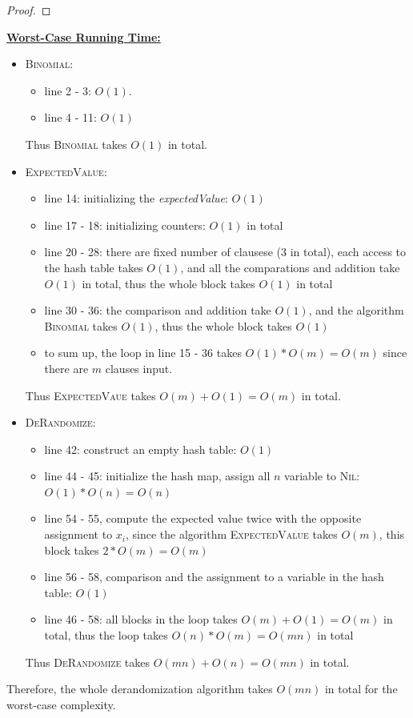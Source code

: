 \documentclass[10pt]{article}
\begin{document}
\begin{enumerate}
\begin{mdframed}
\begin{proof}
\end{proof}
\textbf{\underline{Worst-Case Running Time:}}
\begin{itemize}
    \item \textsc{Binomial}:
    \begin{itemize}
        \item line 2 - 3: $O(1)$.
        \item line 4 - 11: $O(1)$
    \end{itemize}
    Thus \textsc{Binomial} takes $O(1)$ in  total.
    \item \textsc{ExpectedValue}:
    \begin{itemize}
        \item line 14: initializing the \textit{expectedValue}: $O(1)$
        \item line 17 - 18: initializing counters: $O(1)$ in total
        \item line 20 - 28: there are fixed number of clausese (3 in total), each access to the hash table takes $O(1)$, and all the comparations and addition take $O(1)$ in total, thus the whole block takes $O(1)$ in total
        \item line 30 - 36: the comparison and addition take $O(1)$, and the algorithm \textsc{Binomial} takes $O(1)$, thus the whole block takes $O(1)$
        \item to sum up, the loop in line 15 - 36 takes $O(1) * O(m) = O(m)$ since there are $m$ clauses input.
    \end{itemize}
    Thus \textsc{ExpectedVaue} takes $O(m) + O(1) = O(m)$ in total.
    \item \textsc{DeRandomize}:
    \begin{itemize}
        \item line 42: construct an empty hash table: $O(1)$
        \item line 44 - 45: initialize the hash map, assign all $n$ variable to \textsc{Nil}: $O(1) * O(n) = O(n)$
        \item line 54 - 55, compute the expected value twice with the opposite assignment to $x_i$, since the algorithm \textsc{ExpectedValue} takes $O(m)$, this block takes $2 * O(m) = O(m)$
        \item line 56 - 58, comparison and the assignment to a variable in the hash table: $O(1)$
        \item line 46 - 58: all blocks in the loop takes $O(m) + O(1) = O(m)$ in total, thus the loop takes $O(n) * O(m) = O(mn)$ in total
    \end{itemize}
    Thus \textsc{DeRandomize} takes $O(mn) + O(n) = O(mn)$ in total. 
\end{itemize}
Therefore, the whole derandomization algorithm takes $O(mn)$ in total for the worst-case complexity.
    \end{mdframed}
\end{enumerate}
\end{document}
